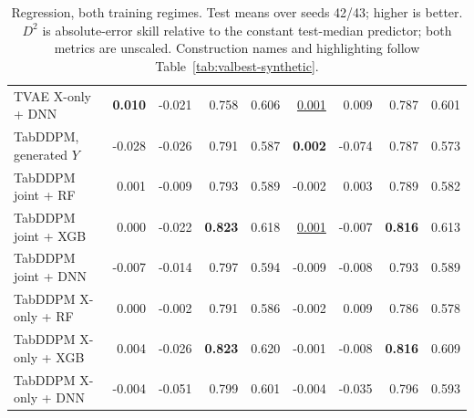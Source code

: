 \begin{table}[p]
\begin{tabular}{@{}lrrrrrrrr@{}}
TVAE X-only + DNN & \textbf{0.010} & -0.021 & 0.758 & 0.606 & \underline{0.001} & 0.009 & 0.787 & 0.601 \\
\addlinespace
TabDDPM, generated $Y$ & -0.028 & -0.026 & 0.791 & 0.587 & \textbf{0.002} & -0.074 & 0.787 & 0.573 \\
TabDDPM joint + RF & 0.001 & -0.009 & 0.793 & 0.589 & -0.002 & 0.003 & 0.789 & 0.582 \\
TabDDPM joint + XGB & 0.000 & -0.022 & \textbf{0.823} & 0.618 & \underline{0.001} & -0.007 & \textbf{0.816} & 0.613 \\
TabDDPM joint + DNN & -0.007 & -0.014 & 0.797 & 0.594 & -0.009 & -0.008 & 0.793 & 0.589 \\
TabDDPM X-only + RF & 0.000 & -0.002 & 0.791 & 0.586 & -0.002 & 0.009 & 0.786 & 0.578 \\
TabDDPM X-only + XGB & 0.004 & -0.026 & \textbf{0.823} & 0.620 & -0.001 & -0.008 & \textbf{0.816} & 0.609 \\
TabDDPM X-only + DNN & -0.004 & -0.051 & 0.799 & 0.601 & -0.004 & -0.035 & 0.796 & 0.593 \\
\bottomrule
\end{tabular}
\caption{Regression, both training regimes. Test means over seeds 42/43; higher is better. $D^2$ is absolute-error skill relative to the constant test-median predictor; both metrics are unscaled. Construction names and highlighting follow Table~\ref{tab:valbest-synthetic}.}
\label{tab:valbest-regression}
\end{table}
